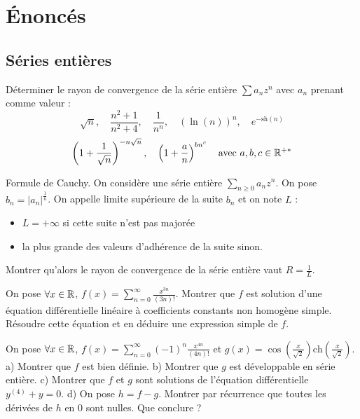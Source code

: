 \section{Énoncés}
\subsection{Séries entières}

\setcounter{numexo}{9}

\begin{exercice}
Déterminer le rayon de convergence de la série entière $\sum a_{n}z^{n}$ avec $a_{n}$ prenant comme valeur : 
$$ \sqrt{n}, \quad \frac{n^{2}+1}{n^{2}+4}, \quad \frac{1}{n^n}, \quad (\ln(n))^{n}, \quad e^{-\mathrm{sh}(n)} $$ 
$$ \left(1+\frac{1}{\sqrt{n}}\right)^{-n\sqrt{n}}, \quad \left(1+\frac{a}{n}\right)^{bn^{c}} \quad \text{avec } a,b,c \in \mathbb{R}^{+*} $$ 
\end{exercice}

\begin{exercice}
Formule de Cauchy. 
On considère une série entière $\sum_{n\ge 0}a_{n}z^{n}$. 
On pose $b_{n}=|a_{n}|^{\frac{1}{n}}$. 
On appelle limite supérieure de la suite $b_{n}$ et on note $L$ : 
\begin{itemize}
 \item $L=+\infty$ si cette suite n'est pas majorée 
 \item la plus grande des valeurs d'adhérence de la suite sinon. 
\end{itemize}
Montrer qu'alors le rayon de convergence de la série entière vaut $R=\frac{1}{L}$. 
\end{exercice}

\begin{exercice}
On pose $\forall x\in\mathbb{R}$, $f(x)=\sum_{n=0}^{\infty}\frac{x^{3n}}{(3n)!}$. 
Montrer que $f$ est solution d'une équation différentielle linéaire à coefficients constants non homogène simple. 
Résoudre cette équation et en déduire une expression simple de $f$. 
\end{exercice}

\begin{exercice}
On pose $\forall x\in\mathbb{R}$, $f(x)=\sum_{n=0}^{\infty}(-1)^{n}\frac{x^{4n}}{(4n)!}$ et $g(x)=\cos\left(\frac{x}{\sqrt{2}}\right)\mathrm{ch}\left(\frac{x}{\sqrt{2}}\right)$. 
a) Montrer que $f$ est bien définie. 
b) Montrer que $g$ est développable en série entière. 
c) Montrer que $f$ et $g$ sont solutions de l'équation différentielle $y^{(4)}+y=0$. 
d) On pose $h=f-g$. Montrer par récurrence que toutes les dérivées de $h$ en 0 sont nulles. Que conclure ? 
\end{exercice}

